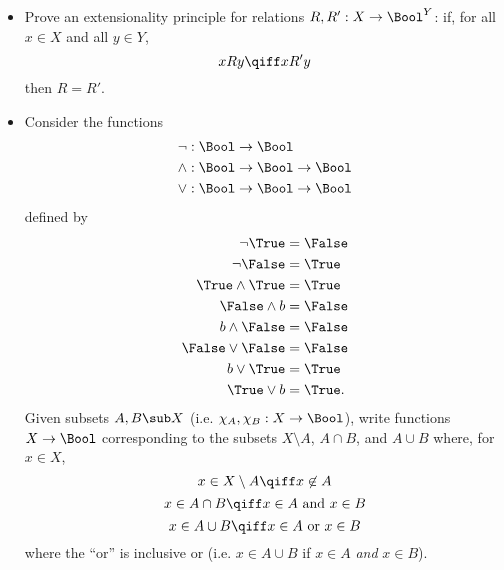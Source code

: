 \begin{itemize}
    \item Prove an extensionality principle for relations $R,R':X\to\Bool^Y$: if, for all $x\in X$ and all $y\in Y$,
        \[ xRy \qiff xR'y \]
    then $R=R'$.

    \item Consider the functions
            \begin{align*}
                \neg &: \Bool \to \Bool\\
                \land   &: \Bool \to \Bool \to \Bool\\
                \lor   &: \Bool \to \Bool \to \Bool
            \end{align*}
            defined by
            \begin{align*}
                \neg\True &= \False\\
                \neg\False &= \True\\
                \True\land\True &= \True\\
                \False\land b &= \False\\
                b\land\False &= \False\\
                \False\lor\False &= \False\\
                b\lor\True &=\True\\
                \True\lor b &= \True.
            \end{align*}
        Given subsets $A,B\sub X$ (i.e. $\chi_A,\chi_B:X\to\Bool$), write functions $X\to\Bool$ corresponding to the subsets $X\setminus A$, $A\cap B$, and $A\cup B$ where, for $x\in X$,
        \[ x\in X\setminus A \qiff x\not\in A \]
        \[ x\in A\cap B \qiff x\in A\text{ and }x\in B \]
        \[ x\in A\cup B \qiff x\in A\text{ or }x\in B \]
        where the ``or'' is inclusive or (i.e. $x\in A\cup B$ if $x\in A$ \textit{and} $x\in B$).
\end{itemize}
